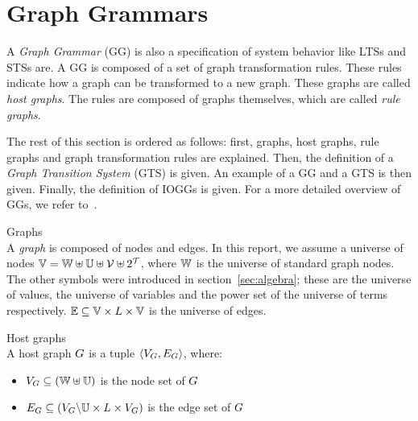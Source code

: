 \section{Graph Grammars}\label{sec:graph}
A \textit{Graph Grammar} (GG) is also a specification of system behavior like LTSs and STSs are. A GG is composed of a set of graph transformation rules. These rules indicate how a graph can be transformed to a new graph. These graphs are called \textit{host graphs}. The rules are composed of graphs themselves, which are called \textit{rule graphs}.

The rest of this section is ordered as follows: first, graphs, host graphs, rule graphs and graph transformation rules are explained. Then, the definition of a \textit{Graph Transition System} (GTS) is given. An example of a GG and a GTS is then given. Finally, the definition of IOGGs is given. For a more detailed overview of GGs, we refer to~\cite{Rensink:graph_grammars, Heckel2006187, Andries1999}.

\vspace{10px}
\begin{definition} Graphs \\
A \textit{graph} is composed of nodes and edges. In this report, we assume a universe of nodes $\mathbb{V} = \mathbb{W} \uplus \mathbb{U} \uplus \mathcal{V} \uplus 2^{\mathcal{T}}$, where $\mathbb{W}$ is the universe of standard graph nodes. The other symbols were introduced in section~\ref{sec:algebra}; these are the universe of values, the universe of variables and the power set of the universe of terms respectively. $\mathbb{E} \subseteq \mathbb{V} \times L \times \mathbb{V}$ is the universe of edges.
\end{definition}

\vspace{10px}
\begin{definition} Host graphs \\
A host graph $G$ is a tuple $\langle V_{G}, E_{G}\rangle$, where:
\begin{itemize}
  \item $V_{G} \subseteq (\mathbb{W} \uplus \mathbb{U})$ is the node set of $G$
  \item $E_{G} \subseteq (V_{G}\backslash\mathbb{U} \times L \times V_{G})$ is the edge set of $G$
\end{itemize}
\end{definition}
\vspace{10px}

